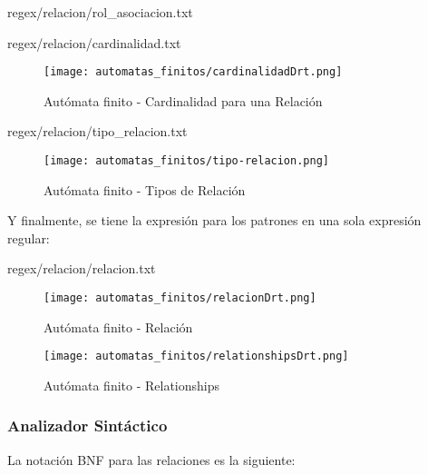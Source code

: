 \begin{lstinputlisting}[basicstyle=\footnotesize\ttfamily, caption={Regex -
  Nombre clase (+Rol) [Relación]},
  label=rerenomclase]{regex/relacion/rol_asociacion.txt}


\begin{lstinputlisting}[basicstyle=\footnotesize\ttfamily, caption={Regex -
  Cardinalidad [Relación]}, label=rerecard]{regex/relacion/cardinalidad.txt}

\begin{figure}[H]
	\centering
	\texttt{[image: automatas\_finitos/cardinalidadDrt.png]}
	\caption{Autómata finito - Cardinalidad para una Relación}
	\label{fig:af_relacion_cardinalidad}
\end{figure}

\begin{lstinputlisting}[basicstyle=\footnotesize\ttfamily, caption={Regex -
  Tipo de Relación [Relación]},
  label=reretiprel]{regex/relacion/tipo_relacion.txt}

\begin{figure}[H]
	\centering
	\texttt{[image: automatas\_finitos/tipo-relacion.png]}
	\caption{Autómata finito - Tipos de Relación}
	\label{fig:af_tipos_relaciones}
\end{figure}

Y finalmente, se tiene la expresión para los patrones en una sola expresión
  regular:

\begin{lstinputlisting}[basicstyle=\footnotesize\ttfamily, caption={Regex -
  Relacion},
  label=rerelacion]{regex/relacion/relacion.txt}

\begin{figure}[H]
	\centering
	\texttt{[image: automatas\_finitos/relacionDrt.png]}
	\caption{Autómata finito - Relación}
	\label{fig:af_relacion}
\end{figure}

\begin{figure}[H]
	\centering
	\texttt{[image: automatas\_finitos/relationshipsDrt.png]}
	\caption{Autómata finito - Relationships}
	\label{fig:relationships}
\end{figure}

\subsubsection{Analizador Sintáctico}

La notación BNF para las relaciones es la siguiente:


\end{lstinputlisting}
\end{lstinputlisting}
\end{lstinputlisting}
\end{lstinputlisting}
